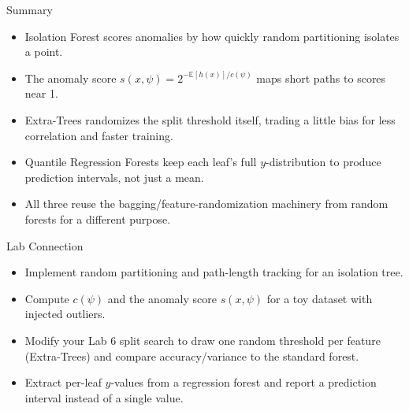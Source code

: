 \begin{frame}{Summary}
\begin{itemize}
  \item Isolation Forest scores anomalies by how quickly random partitioning isolates a point.
  \item The anomaly score $s(x,\psi) = 2^{-\mathbb{E}[h(x)]/c(\psi)}$ maps short paths to scores near 1.
  \item Extra-Trees randomizes the split threshold itself, trading a little bias for less correlation and faster training.
  \item Quantile Regression Forests keep each leaf's full $y$-distribution to produce prediction intervals, not just a mean.
  \item All three reuse the bagging/feature-randomization machinery from random forests for a different purpose.
\end{itemize}
\end{frame}

\begin{frame}{Lab Connection}
\begin{itemize}
  \item Implement random partitioning and path-length tracking for an isolation tree.
  \pause
  \item Compute $c(\psi)$ and the anomaly score $s(x,\psi)$ for a toy dataset with injected outliers.
  \pause
  \item Modify your Lab 6 split search to draw one random threshold per feature (Extra-Trees) and compare accuracy/variance to the standard forest.
  \pause
  \item Extract per-leaf $y$-values from a regression forest and report a prediction interval instead of a single value.
\end{itemize}
\end{frame}
